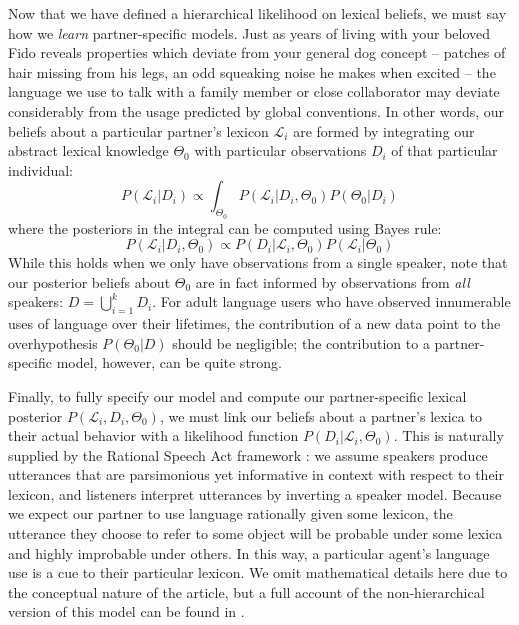 \documentclass[11pt, floatsintext, jou]{apa6}
\begin{document}
Now that we have defined a hierarchical likelihood on lexical beliefs, we must say how we \emph{learn} partner-specific models. Just as years of living with your beloved Fido reveals properties which deviate from your general dog concept -- patches of hair missing from his legs, an odd squeaking noise he makes when excited -- the language we use to talk with a family member or close collaborator may deviate considerably from the usage predicted by global conventions. In other words, our beliefs about a particular partner's lexicon $\mathcal{L}_i$ are formed by integrating our abstract lexical knowledge $\Theta_0$ with particular  observations $D_i$ of that particular individual:
$$%
P(\mathcal{L}_i | D_i)  \propto \int_{\Theta_0}P(\mathcal{L}_i | D_i,  \Theta_0) P(\Theta_0 | D_i) 
$$
where the posteriors in the integral can be computed using Bayes rule:
$$
P(\mathcal{L}_i | D_i, \Theta_0) \propto P(D_i | \mathcal{L}_i, \Theta_0) P(\mathcal{L}_i | \Theta_0)
$$
While this holds when we only have observations from a single speaker, note that our posterior beliefs about $\Theta_0$ are in fact informed by observations from \emph{all} speakers: $D = \bigcup_{i=1}^k D_i$. For  adult language users who have observed innumerable uses of language over their lifetimes, the contribution of a new data point to the overhypothesis $P(\Theta_0 | D)$ should be negligible; the contribution to a partner-specific model, however, can be quite strong. 

Finally, to fully specify our model and compute our partner-specific lexical posterior $P(\mathcal{L}_i, D_i, \Theta_0)$, we must link our beliefs about a partner's lexica to their actual behavior with a likelihood function $P(D_i | \mathcal{L}_i, \Theta_0)$. This is naturally supplied by the Rational Speech Act framework \cite{FrankGoodman12_PragmaticReasoningLanguageGames,GoodmanFrank16_RSATiCS,BergenLevyGoodman16_LexicalUncertainty,SmithGoodmanFrank13_RecursivePragmaticReasoningNIPS}: we assume speakers produce utterances that are parsimonious yet informative in context with respect to their lexicon, and listeners interpret utterances by inverting a speaker model. Because we expect our partner to use language rationally given some lexicon, the utterance they choose to refer to some object will be probable under some lexica and highly improbable under others. In this way, a particular agent's language use is a cue to their particular lexicon. We omit mathematical details here due to the conceptual nature of the article, but a full account of the non-hierarchical version of this model can be found in .
\end{document}
